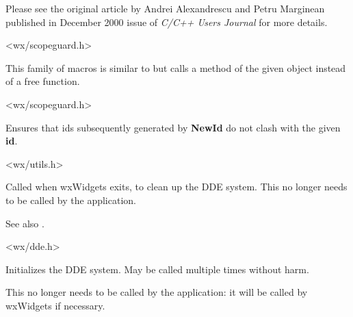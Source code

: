 Please see the original article by Andrei Alexandrescu and Petru Marginean
published in December 2000 issue of \emph{C/C++ Users Journal} for more
details.


<wx/scopeguard.h>




\label{wxonblockexitobj}




This family of macros is similar to 
but calls a method of the given object instead of a free function.


<wx/scopeguard.h>


\label{wxregisterid}


Ensures that ids subsequently generated by {\bf NewId} do not clash with
the given {\bf id}.


<wx/utils.h>


\label{wxddecleanup}


Called when wxWidgets exits, to clean up the DDE system. This no longer needs to be
called by the application.

See also .


<wx/dde.h>


\label{wxddeinitialize}


Initializes the DDE system. May be called multiple times without harm.

This no longer needs to be called by the application: it will be called
by wxWidgets if necessary.

